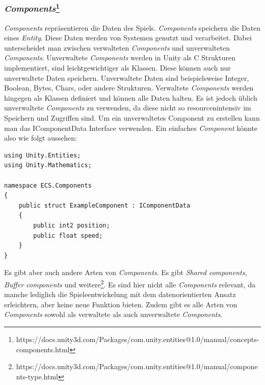 \documentclass[12pt, titlepage]{article}
\DeclareRobustCommand{\#}{\adjustbox{valign=B,totalheight=.57\baselineskip}{\oldhash}}%
\begin{document}
\subsubsection{\textit{Components}\footnote{https://docs.unity3d.com/Packages/com.unity.entities@1.0/manual/concepts-components.html}}
\textit{Components} repräsentieren die Daten des Spiels. \textit{Components} speichern die Daten eines \textit{Entity}. Diese Daten werden von Systemen genutzt und verarbeitet. Dabei unterscheidet man zwischen verwalteten \textit{Components} und unverwalteten \textit{Components}. Unverwaltete \textit{Components} werden in Unity als C\# Strukturen implementiert, sind leichtgewichtiger als Klassen. Diese können auch nur unverwaltete Daten speichern. Unverwaltete Daten sind beispielsweise Integer, Boolean, Bytes, Chars, oder andere Strukturen. Verwaltete \textit{Components} werden hingegen als Klassen definiert und können alle Daten halten. Es ist jedoch üblich unverwaltete \textit{Components} zu verwenden, da diese nicht so resourcenintensiv im Speichern und Zugriffen sind. Um ein unverwaltetes Component zu erstellen kann man das IComponentData Interface verwenden. Ein einfaches \textit{Component} könnte also wie folgt aussehen:
\begin{lstlisting}[style=code, caption={Beispiel unverwaltetes \textit{Component}}]
using Unity.Entities;
using Unity.Mathematics;

namespace ECS.Components
{
    public struct ExampleComponent : IComponentData
    {
        public int2 position;
        public float speed;
    }
}
\end{lstlisting}
Es gibt aber auch andere Arten von \textit{Components}. Es gibt \textit{Shared components}, \textit{Buffer components} und weitere\footnote{https://docs.unity3d.com/Packages/com.unity.entities@1.0/manual/components-type.html}. Es sind hier nicht alle \textit{Components} relevant, da manche lediglich die Spieleentwickelung mit dem datenorientierten Ansatz erleichtern, aber keine neue Funktion bieten. Zudem gibt es alle Arten von \textit{Components} sowohl als verwaltete als auch unverwaltete \textit{Components}.\\
\end{document}

